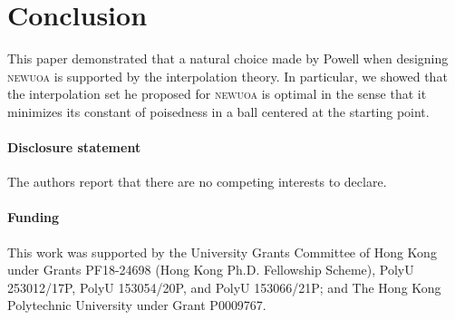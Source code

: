 \documentclass[draft]{article}
\numberwithin{equation}{section}
\theoremstyle{definition}
\theoremstyle{plain}
\theoremstyle{remark}
\newcommand*{\solvername}[1]{\textsc{#1}\xspace}
\begin{document}
\section{Conclusion}

This paper demonstrated that a natural choice made by Powell when designing \solvername{newuoa} is supported by the interpolation theory.
In particular, we showed that the interpolation set he proposed for \solvername{newuoa} is optimal in the sense that it minimizes its constant of poisedness in a ball centered at the starting point.

\paragraph*{Disclosure statement}
The authors report that there are no competing interests to declare.

\paragraph*{Funding}
This work was supported by the University Grants Committee of Hong Kong under Grants PF18-24698 (Hong Kong Ph.D. Fellowship Scheme), PolyU 253012/17P, PolyU 153054/20P, and PolyU 153066/21P; and The Hong Kong Polytechnic University under Grant P0009767.



\end{document}
